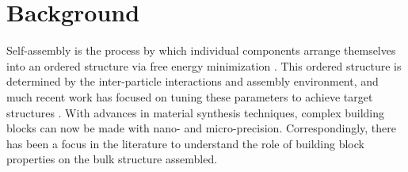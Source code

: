 
%





\section{Background}


Self-assembly is the process by which individual components arrange themselves into an ordered structure via free energy minimization \cite{Whitesides_2002_Science}.
This ordered structure is determined by the inter-particle interactions and assembly environment, and much recent work has focused on tuning these parameters to achieve target structures \cite{Boles_2016_ChemRev}. 
With advances in material synthesis techniques, complex building blocks can now be made with nano- and micro-precision.
Correspondingly, there has been a focus in the literature to understand the role of building block properties on the bulk structure assembled.


